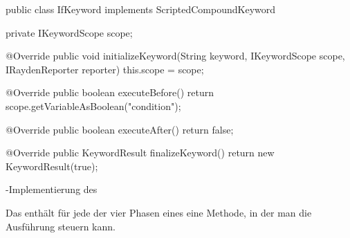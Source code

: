 \begin{program}
\begin{JavaCode}
public class IfKeyword implements ScriptedCompoundKeyword {

  private IKeywordScope scope;

  @Override
  public void initializeKeyword(String keyword, IKeywordScope scope, IRaydenReporter reporter) {
    this.scope = scope;
  }

  @Override
  public boolean executeBefore() {
    return scope.getVariableAsBoolean("condition");
  }

  @Override
  public boolean executeAfter() {
    return false;
  }
  
  @Override
  public KeywordResult finalizeKeyword() {
    return new KeywordResult(true);
  }
}
\end{JavaCode}
\caption{-Implementierung des }
\label{prog:ifKeywordImpl}
\end{program}

\SuperPar
Das  enthält für jede der vier Phasen eines  eine Methode, in der man die Ausführung steuern kann. \\

